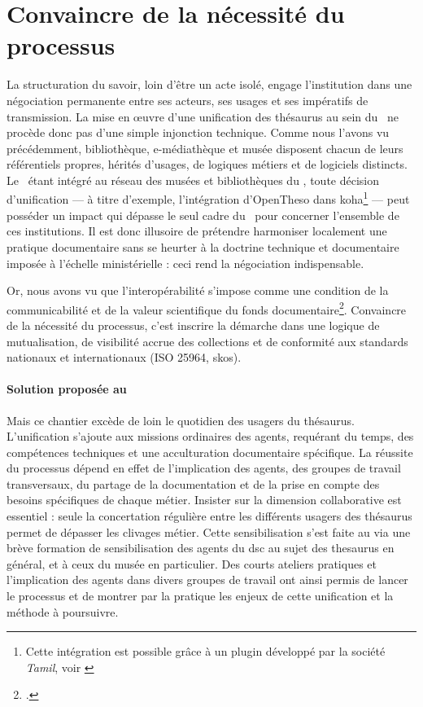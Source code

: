 \section[Un processus collaboratif]{\label{III-B-1}Convaincre de la nécessité du processus}

La structuration du savoir, loin d’être un acte isolé, engage l’institution dans une négociation permanente entre ses acteurs, ses usages et ses impératifs de transmission. La mise en œuvre d’une unification des thésaurus au sein du \mae~ne procède donc pas d’une simple injonction technique. Comme nous l'avons vu précédemment, bibliothèque, e-médiathèque et musée disposent chacun de leurs référentiels propres, hérités d’usages, de logiques métiers et de logiciels distincts. Le \mae~étant intégré au réseau des musées et bibliothèques du \minarm, toute décision d’unification --- à titre d’exemple, l’intégration d’OpenTheso dans \gls{koha}\footnote{Cette intégration est possible grâce à un plugin développé par la société \textit{Tamil}, voir \cite{PluginTamilOpentheso}} --- peut posséder un impact qui dépasse le seul cadre du \mae~pour concerner l'ensemble de ces institutions. Il est donc illusoire de prétendre harmoniser localement une pratique documentaire sans se heurter à la doctrine technique et documentaire imposée à l’échelle ministérielle : ceci rend la négociation indispensable.

Or, nous avons vu que l’interopérabilité s’impose comme une condition de la communicabilité et de la valeur scientifique du fonds documentaire\footcite{hudonISO25964Pour2012a, maroyeISO25964Distinction2015}. Convaincre de la nécessité du processus, c’est inscrire la démarche dans une logique de mutualisation, de visibilité accrue des collections et de conformité aux standards nationaux et internationaux (ISO 25964, \gls{skos}).

\paragraph*{Solution proposée au \mae}
Mais ce chantier excède de loin le quotidien des usagers du thésaurus. L’unification s’ajoute aux missions ordinaires des agents, requérant du temps, des compétences techniques et une acculturation documentaire spécifique. La réussite du processus dépend en effet de l’implication des agents, des groupes de travail transversaux, du partage de la documentation et de la prise en compte des besoins spécifiques de chaque métier. Insister sur la dimension collaborative est essentiel : seule la concertation régulière entre les différents usagers des thésaurus permet de dépasser les clivages métier. Cette sensibilisation s'est faite au \mae via une brève formation de sensibilisation des agents du \ac{dsc} au sujet des \gls{thesaurus} en général, et à ceux du musée en particulier. Des courts ateliers pratiques et l'implication des agents dans divers groupes de travail ont ainsi permis de lancer le processus et de montrer par la pratique les enjeux de cette unification et la méthode à poursuivre.